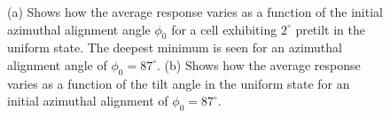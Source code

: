 \begin{figure}
\begin{center}
\end{center}
\caption[Optimising values of $\phi_0$ and $\theta_0$ for uniform state]{\label{fig:vary_tilt}(a) Shows how the average response varies as a function of the initial azimuthal alignment angle $\phi_0$ for a cell exhibiting $2^{\circ}$ pretilt in the uniform state. The deepest minimum is seen for an azimuthal alignment angle of $\phi_0=87^{\circ}$. (b) Shows how the average response varies as a function of the tilt angle in the uniform state for an initial azimuthal alignment of $\phi_0=87^{\circ}$.}
\end{figure}

